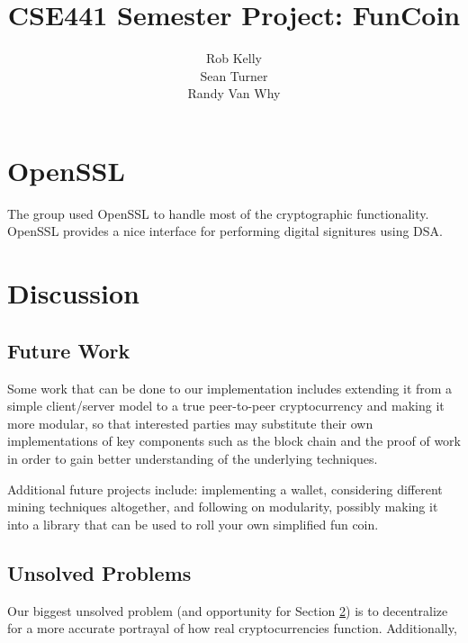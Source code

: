 \documentclass[12pt]{article}
\begin{document}
\title{CSE441 Semester Project: FunCoin}
\author{Rob Kelly\\Sean Turner\\Randy Van Why}
\maketitle


\section{OpenSSL}
The group used OpenSSL to handle most of the cryptographic functionality. OpenSSL provides a nice interface for performing digital signitures using DSA.

\section{Discussion}\label{future}
\subsection{Future Work}
Some work that can be done to our implementation includes extending it from a simple client/server model to a true peer-to-peer cryptocurrency and making it more modular, so that interested parties may substitute their own implementations of key components such as the block chain and the proof of work in order to gain better understanding of the underlying techniques. 

Additional future projects include: implementing a wallet, considering different mining techniques altogether, and following on modularity, possibly making it into a library that can be used to roll your own simplified fun coin.

\subsection{Unsolved Problems}
Our biggest unsolved problem (and opportunity for Section \ref{future}) is to decentralize for a more accurate portrayal of how real cryptocurrencies function. Additionally, 
\end{document}
